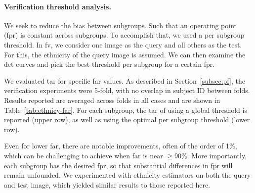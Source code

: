 \vspace{-5mm}
\noindent\paragraph{Verification threshold analysis.}%
We seek to reduce the bias between subgroups. Such that an operating point (\ie \gls{fpr}) is constant across subgroups. To accomplish that, we used a per subgroup threshold. In \gls{fv}, we consider one image as the query and all others as the test. For this, the ethnicity of the query image is assumed. We can then examine the \gls{det} curves and pick the best threshold per subgroup for a certain \gls{fpr}.

We evaluated \gls{tar} for specific \gls{far} values. As described in Section~\ref{subsec:pf}, the verification experiments were 5-fold, with no overlap in subject ID between folds. Results reported are averaged across folds in all cases and are shown in Table~\ref{tab:ethnicy-far}. For each subgroup, the \gls{tar} of using a global threshold is reported (upper row), as well as using the optimal per subgroup threshold (lower row). 

Even for lower \gls{far}, there are notable improvements, often of the order of 1\%, which can be challenging to achieve when \gls{far} is near $\geq$90\%. More importantly, each subgroup has the desired \gls{fpr}, so that substantial differences in \gls{fpr} will remain unfounded. We experimented with ethnicity estimators on both the query and test image, which yielded similar results to those reported here.

